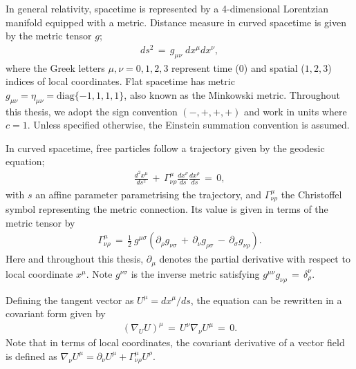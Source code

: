 In general relativity, spacetime is represented by a 4-dimensional Lorentzian manifold equipped with a metric. Distance measure in curved spacetime is given by the metric tensor $g$;
\begin{align}
	ds^2 \,=\, g_{\mu \nu} \; dx^\mu dx^\nu	,
\end{align}
where the Greek letters $\mu, \nu = 0,1,2,3$ represent time ($0$) and spatial ($1,2,3$) indices of local coordinates. Flat spacetime has metric $g_{\mu\nu} = \eta_{\mu\nu} = \text{diag}\{-1, 1, 1, 1\}$, also known as the Minkowski metric. Throughout this thesis, we adopt the sign convention $(-, +, +, +)$ and work in units where $c=1$. Unless specified otherwise, the Einstein summation convention is assumed. 

In curved spacetime, free particles follow a trajectory given by the geodesic equation;
\begin{align}
	\frac{d^2x^\mu}{ds^2} \,+\, \Gamma^\mu_{\nu \rho} \frac{dx^\nu}{ds} \frac{dx^\rho}{ds} \,=\, 0,  \label{eqn:geodesic}
\end{align}
with $s$ an affine parameter parametrising the trajectory, and $\Gamma^\mu_{\nu\rho}$ the Christoffel symbol representing the metric connection. Its value is given in terms of the metric tensor by
\begin{align}
	\Gamma^{\mu}_{\nu\rho} \,=\, \frac{1}{2}~ g^{\mu\sigma} \left( \partial_\rho g_{\nu\sigma} \,+\, \partial_\nu g_{\rho\sigma} \,-\, \partial_\sigma g_{\nu\rho}  \right). \label{def:Levi_Civita}
\end{align}
Here and throughout this thesis, $\partial_\mu$ denotes the partial derivative with respect to local coordinate $x^\mu$. Note $g^{\nu\sigma}$ is the inverse metric satisfying $g^{\mu\nu} g_{\nu\rho} \,=\, \delta^\nu_\rho$.

Defining the tangent vector as $U^\mu = dx^\mu / ds$, the equation can be rewritten in a covariant form given by
\begin{align}
	\left( \nabla_U U \right)^\mu \,=\, U^\nu \nabla_\nu U^\mu \,=\, 0. \label{eqn:geodesic_covariant}
\end{align}
Note that in terms of local coordinates, the covariant derivative of a vector field is defined as $\nabla_\nu U^\mu = \partial_\nu U^\mu + \Gamma^\mu_{\nu\rho} U^\rho$.

